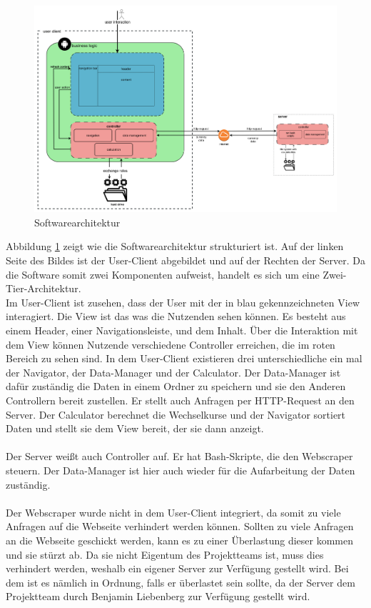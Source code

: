 \documentclass[conference]{IEEEtran}
\begin{document}
\begin{figure}[h]
	\centering
	\includegraphics[width=1\linewidth, frame]{Software-Architektur_SWEII}
	\caption[Softwarearchitektur]{Softwarearchitektur}
	\label{fig:software-architektursweii}
\end{figure}
\noindent
Abbildung \ref{fig:software-architektursweii} zeigt wie die Softwarearchitektur strukturiert ist. Auf der linken Seite des Bildes ist der User-Client abgebildet und auf der Rechten der Server. Da die Software somit zwei Komponenten aufweist, handelt es sich um eine Zwei-Tier-Architektur. \\
Im User-Client ist zusehen, dass der User mit der in blau gekennzeichneten View interagiert. Die View ist das was die Nutzenden sehen können. Es besteht aus einem Header, einer Navigationsleiste, und dem Inhalt. Über die Interaktion mit dem View können Nutzende verschiedene Controller erreichen, die im roten Bereich zu sehen sind. In dem User-Client existieren drei unterschiedliche ein mal der Navigator, der Data-Manager und der Calculator. Der Data-Manager ist dafür zuständig die Daten in einem Ordner zu speichern und sie den Anderen Controllern bereit zustellen. Er stellt auch Anfragen per HTTP-Request an den Server. Der Calculator berechnet die Wechselkurse und der Navigator sortiert Daten und stellt sie dem View bereit, der sie dann anzeigt. \\\\ Der Server weißt auch Controller auf. Er hat Bash-Skripte, die den Webscraper steuern. Der Data-Manager ist hier auch wieder für die Aufarbeitung der Daten zuständig. \\\\ Der Webscraper wurde nicht in dem User-Client integriert, da somit zu viele Anfragen auf die Webseite verhindert werden können. Sollten zu viele Anfragen an die Webseite geschickt werden, kann es zu einer Überlastung dieser kommen und sie stürzt ab. Da sie nicht Eigentum des Projektteams ist, muss dies verhindert werden, weshalb ein eigener Server zur Verfügung gestellt wird. Bei dem ist es nämlich in Ordnung, falls er überlastet sein sollte, da der Server dem Projektteam durch Benjamin Liebenberg zur Verfügung gestellt wird.
\end{document}
